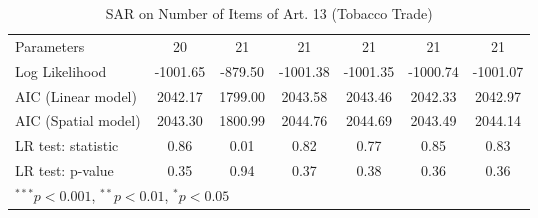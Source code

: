 \begin{table}[!h]
\begin{center}
\begin{tabular}{l c c c c c c }
Parameters              & 20           & 21           & 21           & 21           & 21           & 21           \\
Log Likelihood          & -1001.65     & -879.50      & -1001.38     & -1001.35     & -1000.74     & -1001.07     \\
AIC (Linear model)      & 2042.17      & 1799.00      & 2043.58      & 2043.46      & 2042.33      & 2042.97      \\
AIC (Spatial model)     & 2043.30      & 1800.99      & 2044.76      & 2044.69      & 2043.49      & 2044.14      \\
LR test: statistic      & 0.86         & 0.01         & 0.82         & 0.77         & 0.85         & 0.83         \\
LR test: p-value        & 0.35         & 0.94         & 0.37         & 0.38         & 0.36         & 0.36         \\
\bottomrule
\multicolumn{7}{l}{\scriptsize{$^{***}p<0.001$, $^{**}p<0.01$, $^*p<0.05$}}
\end{tabular}
\caption{SAR on Number of Items of Art. 13 (Tobacco Trade)}
\label{table:coefficients}
\end{center}
\end{table}

